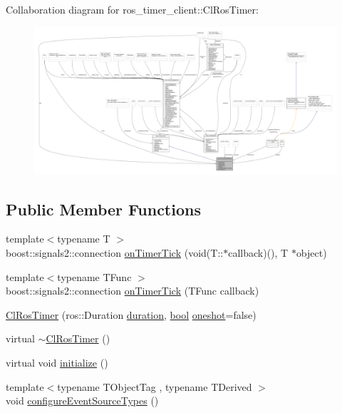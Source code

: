 Collaboration diagram for ros\+\_\+timer\+\_\+client\+:\+:Cl\+Ros\+Timer\+:\nopagebreak
\begin{figure}[H]
\begin{center}
\leavevmode
\includegraphics[width=350pt]{classros__timer__client_1_1ClRosTimer__coll__graph}
\end{center}
\end{figure}
\subsection*{Public Member Functions}
\begin{DoxyCompactItemize}
\item 
{\footnotesize template$<$typename T $>$ }\\boost\+::signals2\+::connection \hyperlink{classros__timer__client_1_1ClRosTimer_a06ecf6427b5df59f29879ab3bd1f120c}{on\+Timer\+Tick} (void(T\+::$\ast$callback)(), T $\ast$object)
\item 
{\footnotesize template$<$typename T\+Func $>$ }\\boost\+::signals2\+::connection \hyperlink{classros__timer__client_1_1ClRosTimer_a0ad81e975f7ea9f4b8e947663109c0eb}{on\+Timer\+Tick} (T\+Func callback)
\item 
\hyperlink{classros__timer__client_1_1ClRosTimer_a7a8cde0adf8d957dc0fe20f38b6ae1bd}{Cl\+Ros\+Timer} (ros\+::\+Duration \hyperlink{classros__timer__client_1_1ClRosTimer_a79df7a52481e520ba959f3e6afb0a817}{duration}, \hyperlink{classbool}{bool} \hyperlink{classros__timer__client_1_1ClRosTimer_a767e8c7723206bd7a0a49f660418d628}{oneshot}=false)
\item 
virtual \hyperlink{classros__timer__client_1_1ClRosTimer_a099e3ba0adbd67092703bd5c776d6c3f}{$\sim$\+Cl\+Ros\+Timer} ()
\item 
virtual void \hyperlink{classros__timer__client_1_1ClRosTimer_a2d290d2a5d0afa7cdab543b17dbddbff}{initialize} ()
\item 
{\footnotesize template$<$typename T\+Object\+Tag , typename T\+Derived $>$ }\\void \hyperlink{classros__timer__client_1_1ClRosTimer_aab7de28c1ae3d58090fd6031a9b5bc54}{configure\+Event\+Source\+Types} ()
\end{DoxyCompactItemize}
